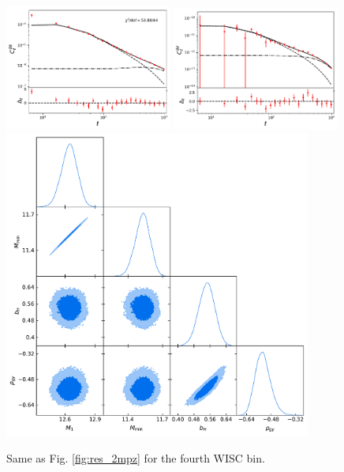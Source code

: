 \documentclass{article}
\begin{document}
  \begin{figure}
    \centering
    \includegraphics[width = 0.49\textwidth]{../output_test/sampler_minimal_hmc_wisc4_cls_wisc4_wisc4}
    \includegraphics[width = 0.49\textwidth]{../output_test/sampler_minimal_hmc_wisc4_cls_wisc4_y_milca}
    \includegraphics[width = 0.90\textwidth]{../output_test/sampler_minimal_hmc_wisc4_triangle}
    \caption{Same as Fig. \ref{fig:res_2mpz} for the fourth WISC bin.}\label{fig:res_wisc4}
  \end{figure}
\end{document}
